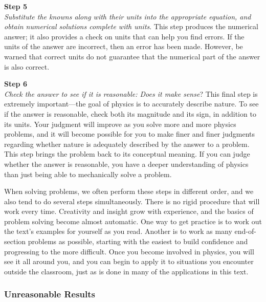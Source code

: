 \documentclass[../../main-ap-physics.tex]{subfiles}
\begin{document}
\vspace{1em}

\textbf{Step 5}\\
\textit{Substitute the knowns along with their units into the appropriate equation, and obtain numerical solutions complete with units}. This step produces the numerical answer; it also provides a check on units that can help you find errors. If the units of the answer are incorrect, then an error has been made. However, be warned that correct units do not guarantee that the numerical part of the answer is also correct.

\vspace{1em}

\textbf{Step 6}\\
\textit{Check the answer to see if it is reasonable: Does it make sense}? This final step is extremely important---the goal of physics is to accurately describe nature. To see if the answer is reasonable, check both its magnitude and its sign, in addition to its units. Your judgment will improve as you solve more and more physics problems, and it will become possible for you to make finer and finer judgments regarding whether nature is adequately described by the answer to a problem. This step brings the problem back to its conceptual meaning. If you can judge whether the answer is reasonable, you have a deeper understanding of physics than just being able to mechanically solve a problem.

\vspace{1em}

When solving problems, we often perform these steps in different order, and we also tend to do several steps simultaneously. There is no rigid procedure that will work every time. Creativity and insight grow with experience, and the basics of problem solving become almost automatic. One way to get practice is to work out the text's examples for yourself as you read. Another is to work as many end-of-section problems as possible, starting with the easiest to build confidence and progressing to the more difficult. Once you become involved in physics, you will see it all around you, and you can begin to apply it to situations you encounter outside the classroom, just as is done in many of the applications in this text.

\subsubsection*{Unreasonable Results}
\end{document}
